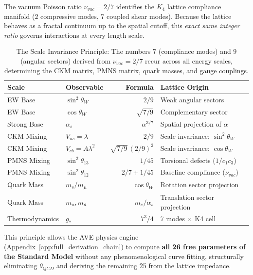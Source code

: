 The vacuum Poisson ratio $\nu_{vac} = 2/7$ identifies the $K_4$
lattice compliance manifold (2 compressive modes, 7 coupled shear modes).
Because the lattice behaves as a fractal continuum up to the spatial
cutoff, this \emph{exact same integer ratio} governs interactions at
every length scale.

\begin{table}[h]
\centering
\small
\begin{tabular}{llrl}
\toprule
\textbf{Scale} & \textbf{Observable} & \textbf{Formula} & \textbf{Lattice Origin} \\
\midrule
EW Base     & $\sin^2\theta_W$ & $2/9$ & Weak angular sectors \\
EW Base     & $\cos\theta_W$ & $\sqrt{7/9}$ & Complementary sector \\
Strong Base & $\alpha_s$ & $\alpha^{3/7}$ & Spatial projection of $\alpha$ \\
CKM Mixing  & $V_{us} = \lambda$ & $2/9$ & Scale invariance: $\sin^2\theta_W$ \\
CKM Mixing  & $V_{cb} = A\lambda^2$ & $\sqrt{7/9}\,(2/9)^2$ & Scale invariance: $\cos\theta_W$ \\
PMNS Mixing & $\sin^2\theta_{13}$ & $1/45$ & Torsional defects ($1/c_1c_3$) \\
PMNS Mixing & $\sin^2\theta_{12}$ & $2/7 + 1/45$ & Baseline compliance ($\nu_{vac}$) \\
Quark Mass  & $m_s / m_\mu$ & $\cos\theta_W$ & Rotation sector projection \\
Quark Mass  & $m_u, m_d$ & $m_e/\alpha_s$ & Translation sector projection \\
Thermodynamics & $g_*$ & $7^3/4$ & 7 modes $\times$ K4 cell \\
\bottomrule
\end{tabular}
\caption{The Scale Invariance Principle: The numbers 7 (compliance modes)
and 9 (angular sectors) derived from $\nu_{vac} = 2/7$ recur across
all energy scales, determining the CKM matrix, PMNS matrix, quark
masses, and gauge couplings.}
\label{tab:scale_invariance}
\end{table}

This principle allows the AVE physics engine (Appendix~\ref{app:full_derivation_chain})
to compute \textbf{all 26 free parameters of the Standard Model}
without any phenomenological curve fitting, structurally eliminating
$\theta_{QCD}$ and deriving the remaining 25 from the lattice impedance.

